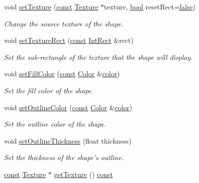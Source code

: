 \begin{DoxyCompactItemize}
void \hyperlink{classsf_1_1_shape_af8fb22bab1956325be5d62282711e3b6}{set\-Texture} (\hyperlink{term__entry_8h_a57bd63ce7f9a353488880e3de6692d5a}{const} \hyperlink{classsf_1_1_texture}{Texture} $\ast$texture, \hyperlink{term__entry_8h_a002004ba5d663f149f6c38064926abac}{bool} reset\-Rect=\hyperlink{_snake_8cpp_ae6c865df784842196d411c1466b01686}{false})
\begin{DoxyCompactList}\small\item\em Change the source texture of the shape. \end{DoxyCompactList}\item 
void \hyperlink{classsf_1_1_shape_a2029cc820d1740d14ac794b82525e157}{set\-Texture\-Rect} (\hyperlink{term__entry_8h_a57bd63ce7f9a353488880e3de6692d5a}{const} \hyperlink{namespacesf_a1b1279ab06950b96686cffaacb72fed5}{Int\-Rect} \&rect)
\begin{DoxyCompactList}\small\item\em Set the sub-\/rectangle of the texture that the shape will display. \end{DoxyCompactList}\item 
void \hyperlink{classsf_1_1_shape_a3506f9b5d916fec14d583d16f23c2485}{set\-Fill\-Color} (\hyperlink{term__entry_8h_a57bd63ce7f9a353488880e3de6692d5a}{const} \hyperlink{classsf_1_1_color}{Color} \&\hyperlink{_entity_8cpp_a864889304a90873adb9c6e289a54bcf4}{color})
\begin{DoxyCompactList}\small\item\em Set the fill color of the shape. \end{DoxyCompactList}\item 
void \hyperlink{classsf_1_1_shape_a5978f41ee349ac3c52942996dcb184f7}{set\-Outline\-Color} (\hyperlink{term__entry_8h_a57bd63ce7f9a353488880e3de6692d5a}{const} \hyperlink{classsf_1_1_color}{Color} \&\hyperlink{_entity_8cpp_a864889304a90873adb9c6e289a54bcf4}{color})
\begin{DoxyCompactList}\small\item\em Set the outline color of the shape. \end{DoxyCompactList}\item 
void \hyperlink{classsf_1_1_shape_a5ad336ad74fc1f567fce3b7e44cf87dc}{set\-Outline\-Thickness} (float thickness)
\begin{DoxyCompactList}\small\item\em Set the thickness of the shape's outline. \end{DoxyCompactList}\item 
\hyperlink{term__entry_8h_a57bd63ce7f9a353488880e3de6692d5a}{const} \hyperlink{classsf_1_1_texture}{Texture} $\ast$ \hyperlink{classsf_1_1_shape_a1bf27ac425fcce36efd0eed67531a403}{get\-Texture} () \hyperlink{term__entry_8h_a57bd63ce7f9a353488880e3de6692d5a}{const} 

\end{DoxyCompactItemize}

